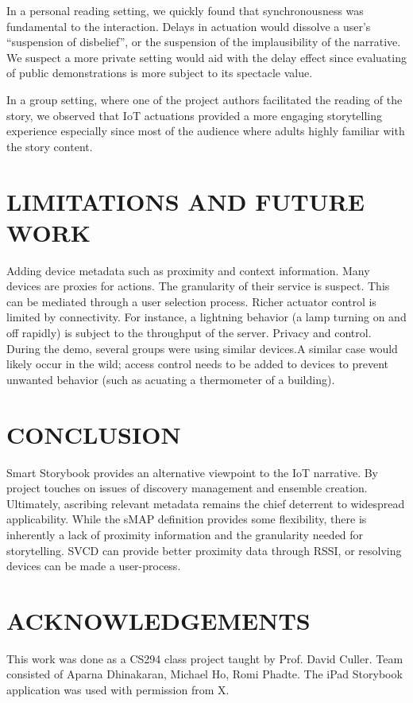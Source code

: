 \documentclass{sigchi}
\begin{document}
In a personal reading setting, we quickly found that synchronousness was fundamental to the interaction. Delays in actuation would dissolve a user's ``suspension of disbelief'', or the suspension of the implausibility of the narrative. We suspect a more private setting would aid with the delay effect since evaluating of public demonstrations is more subject to its spectacle value. 

In a group setting, where one of the project authors facilitated the reading of the story, we observed that IoT actuations provided a more engaging storytelling experience especially since most of the audience where adults highly familiar with the story content. 




\section{LIMITATIONS AND FUTURE WORK}
Adding device metadata such as proximity and context information. Many devices are proxies for actions. The granularity of their service is suspect. This can be mediated through a user selection process. 
Richer actuator control is limited by connectivity. For instance, a lightning behavior (a lamp turning on and off rapidly) is subject to the throughput of the server.
Privacy and control. During the demo, several groups were using similar devices.A similar case would likely occur in the wild; access control needs to be added to devices to prevent unwanted behavior (such as acuating a thermometer of a building). 

\section{CONCLUSION}
Smart Storybook provides an alternative viewpoint to the IoT narrative. By project touches on issues of discovery management and ensemble creation. Ultimately, ascribing relevant metadata remains the chief deterrent to widespread applicability. While the sMAP definition provides some flexibility,  there is inherently a lack of proximity information and the granularity needed for storytelling. SVCD can provide better proximity data through RSSI, or resolving devices can be made a user-process.


\section{ACKNOWLEDGEMENTS}
This work was done as a CS294 class project taught by Prof. David Culler. 
Team consisted of Aparna Dhinakaran, Michael Ho, Romi Phadte. 
The iPad Storybook application was used with permission from X. 

\balance


\end{document}
